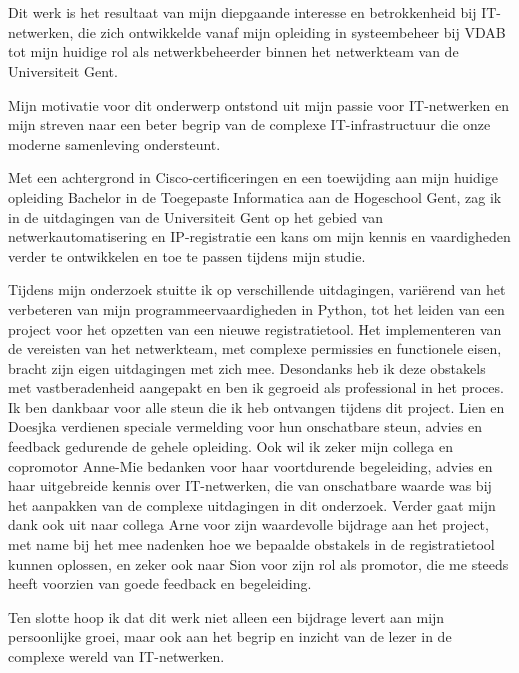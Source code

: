 
\chapter*{}%
\label{ch:voorwoord}

Dit werk is het resultaat van mijn diepgaande interesse en betrokkenheid bij IT-netwerken, die zich ontwikkelde vanaf mijn opleiding in systeembeheer bij VDAB tot mijn huidige rol als netwerkbeheerder binnen het netwerkteam van de \\Universiteit Gent.

Mijn motivatie voor dit onderwerp ontstond uit mijn passie voor IT-netwerken en mijn streven naar een beter begrip van de complexe IT-infrastructuur die onze \\moderne samenleving ondersteunt. 

Met een achtergrond in Cisco-certificeringen en een toewijding aan mijn huidige opleiding Bachelor in de Toegepaste Informatica aan de Hogeschool Gent, zag ik in de uitdagingen van de Universiteit Gent op het gebied van netwerkautomatisering en IP-registratie een kans om mijn kennis en vaardigheden verder te ontwikkelen en toe te passen tijdens mijn studie.

Tijdens mijn onderzoek stuitte ik op verschillende uitdagingen, variërend van het verbeteren van mijn programmeervaardigheden in Python, tot het leiden van een project voor het opzetten van een nieuwe registratietool. Het implementeren van de vereisten van het netwerkteam, met complexe permissies en functionele eisen, bracht zijn eigen uitdagingen met zich mee. Desondanks heb ik deze obstakels met vastberadenheid aangepakt en ben ik gegroeid als professional in het proces.
\\
Ik ben dankbaar voor alle steun die ik heb ontvangen tijdens dit project. Lien en Doesjka verdienen speciale vermelding voor hun onschatbare steun, advies en feedback gedurende de gehele opleiding. Ook wil ik zeker mijn collega en \\copromotor Anne-Mie bedanken voor haar voortdurende begeleiding, advies en haar uitgebreide kennis over IT-netwerken, die van onschatbare waarde was bij het aanpakken van de complexe uitdagingen in dit onderzoek. Verder gaat mijn dank ook uit naar collega Arne voor zijn waardevolle bijdrage aan het project, met name bij het mee nadenken hoe we bepaalde obstakels in de registratietool kunnen oplossen, en zeker ook naar Sion voor zijn rol als promotor, die me steeds heeft voorzien van goede feedback en begeleiding.

Ten slotte hoop ik dat dit werk niet alleen een bijdrage levert aan mijn persoonlijke groei, maar ook aan het begrip en inzicht van de lezer in de complexe wereld van IT-netwerken.
